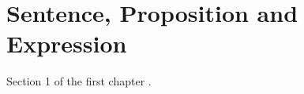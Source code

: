 \section{Sentence, Proposition and Expression}
Section 1 of the first chapter \cite{exemplochapter1sec1} \cite{artigo2024chapter1sec1}.

\printbibliography[heading=subbibliography, title={Referências da Seção 1.1}, keyword=chapter1secao1]